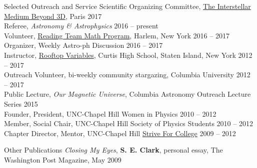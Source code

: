\documentclass{resume_clark} %
\begin{document}
\begin{rSection}{Selected Outreach and Service}
Scientific Organizing Committee, \href{https://www.ias.u-psud.fr/ism3d/}{The Interstellar Medium Beyond 3D}, Paris \hfill{2017}\\
Referee, {\it Astronomy \& Astrophysics} \hfill{2016 -- present}\\
Volunteer, \href{http://www.readingteam.org/}{Reading Team Math Program}, Harlem, New York \hfill{2016 -- 2017}\\
Organizer, Weekly Astro-ph Discussion \hfill{2016 -- 2017}\\
Instructor, \href{http://rv.astro.columbia.edu/}{Rooftop Variables}, Curtis High School, Staten Island, New York \hfill{2012 -- 2017}\\
Outreach Volunteer, bi-weekly community stargazing, Columbia University \hfill{2012 -- 2017}\\
Public Lecture, \textit{Our Magnetic Universe}, Columbia Astronomy Outreach Lecture Series \hfill{2015} \\ 
Founder, President, UNC-Chapel Hill Women in Physics \hfill{2010 -- 2012}\\
Member, Social Chair, UNC-Chapel Hill Society of Physics Students \hfill{2010 -- 2012}\\
Chapter Director, Mentor, UNC-Chapel Hill \href{http://striveforcollege.org/}{Strive For College} \hfill{2009 -- 2012}

\end{rSection}




\begin{rSection}{Other Publications}
{\textit{Closing My Eyes}}, \textbf{S. E. Clark}, personal essay, The Washington Post Magazine, May 2009
\end{rSection}

\end{document}
